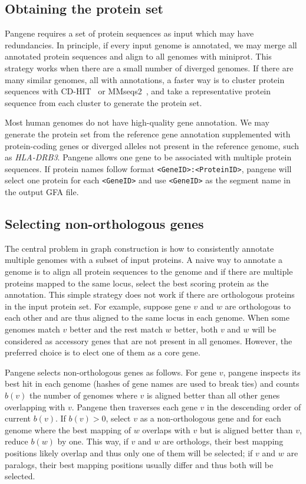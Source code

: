 \documentclass[webpdf,contemporary,large,namedate]{oup-authoring-template}%
\begin{document}
\subsection{Obtaining the protein set}

Pangene requires a set of protein sequences as input which may have redundancies.
In principle, if every input genome is annotated, we may merge all annotated protein sequences
and align to all genomes with miniprot.
This strategy works when there are a small number of diverged genomes.
If there are many similar genomes, all with annotations,
a faster way is to cluster protein sequences with CD-HIT~\citep{Li:2006aa} or MMseqs2~\citep{Schneider:2017aa},
and take a representative protein sequence from each cluster to generate the protein set.

Most human genomes do not have high-quality gene annotation.
We may generate the protein set from the reference gene annotation supplemented
with protein-coding genes or diverged alleles not present in the reference genome, such as \emph{HLA-DRB3}.
Pangene allows one gene to be associated with multiple protein sequences.
If protein names follow format {\tt <GeneID>:<ProteinID>},
pangene will select one protein for each {\tt <GeneID>} and use {\tt <GeneID>} as the segment name in the output GFA file.

\subsection{Selecting non-orthologous genes}

The central problem in graph construction is how to consistently annotate multiple genomes with a subset of input proteins.
A naive way to annotate a genome is to align all protein sequences to the genome
and if there are multiple proteins mapped to the same locus, select the best scoring protein as the annotation.
This simple strategy does not work if there are orthologous proteins in the input protein set.
For example, suppose gene $v$ and $w$ are orthologous to each other and are thus aligned to the same locus in each genome.
When some genomes match $v$ better and the rest match $w$ better,
both $v$ and $w$ will be considered as accessory genes that are not present in all genomes.
However, the preferred choice is to elect one of them as a core gene.

Pangene selects non-orthologous genes as follows.
For gene $v$, pangene inspects its best hit in each genome (hashes of gene names are used to break ties)
and counts $b(v)$ the number of genomes where $v$ is aligned better than all other genes overlapping with $v$.
Pangene then traverses each gene $v$ in the descending order of current $b(v)$.
If $b(v)>0$, select $v$ as a non-orthologous gene and for each genome where the best mapping of $w$ overlaps with $v$ but is aligned better than $v$, reduce $b(w)$ by one.
This way, if $v$ and $w$ are orthologs, their best mapping positions likely overlap and thus only one of them will be selected;
if $v$ and $w$ are paralogs, their best mapping positions usually differ and thus both will be selected.
\end{document}
